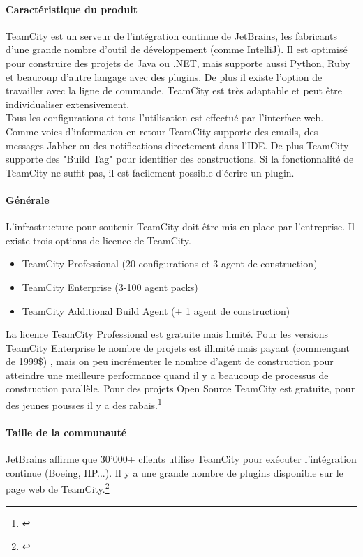\paragraph{Caractéristique du produit} TeamCity est un serveur de l'intégration continue de JetBrains, les fabricants d'une grande nombre d'outil de développement (comme IntelliJ). Il est optimisé pour construire des projets de Java ou .NET, mais supporte aussi Python, Ruby et beaucoup d'autre langage avec des plugins. De plus il existe l'option de travailler avec la ligne de commande. TeamCity est très adaptable et peut être individualiser extensivement. \\
Tous les configurations et tous l'utilisation est effectué par l'interface web. Comme voies d'information en retour TeamCity supporte des emails, des messages Jabber ou des notifications directement dans l'IDE. De plus TeamCity supporte des "Build Tag" pour identifier des constructions. Si la fonctionnalité de TeamCity ne suffit pas, il est facilement possible d'écrire un plugin.

\paragraph{Générale} L'infrastructure pour soutenir TeamCity doit être mis en place par l'entreprise. Il existe trois options de licence de TeamCity.
\begin{itemize}
	\item TeamCity Professional (20 configurations et 3 agent de construction)
	\item TeamCity Enterprise (3-100 agent packs)
	\item TeamCity Additional Build Agent (+ 1 agent de construction)
\end{itemize}
La licence TeamCity Professional est gratuite mais limité. Pour les versions TeamCity Enterprise le nombre de projets est illimité mais payant (commençant de 1999\$) , mais on peu incrémenter le nombre d'agent de construction pour atteindre une meilleure performance quand il y a beaucoup de processus de construction parallèle. Pour des projets Open Source TeamCity est gratuite, pour des jeunes pousses il y a des rabais.\footnote{\citep{teamcitybuy}}
\paragraph{Taille de la communauté}
JetBrains affirme que 30'000+ clients utilise TeamCity pour exécuter l'intégration continue (Boeing, HP...). Il y a une grande nombre de plugins disponible sur le page web de TeamCity.\footnote{\citep{teamcityplugins}}
